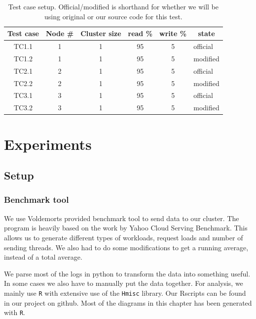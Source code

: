 \begin{center}
\begin{table}[h]
	\begin{tabular}{|c|c|c|c|c|l|}
		\multicolumn{1}{c}{Test case} & 
		\multicolumn{1}{c}{Node \#} &
		\multicolumn{1}{c}{Cluster size} &  
		\multicolumn{1}{c}{read \%} & 
		\multicolumn{1}{c}{write \%} & 
		\multicolumn{1}{c}{state} \\
		\hline

		TC1.1 & 1 & 1 & 95 & 5 & official \\
		TC1.2 & 1 & 1 & 95 & 5 & modified \\
		\hline
		TC2.1 & 2 & 1 & 95 & 5 & official \\
		TC2.2 & 2 & 1 & 95 & 5 & modified \\
		\hline
		TC3.1 & 3 & 1 & 95 & 5 & official \\
		TC3.2 & 3 & 1 & 95 & 5 & modified \\

		\hline
	\end{tabular}
	\caption{Test case setup. Official/modified is shorthand for whether we will be using original or our source code for this test.}
	\label{tbl:testcases}
\end{table}
\end{center}




\section{Experiments}
\subsection{Setup}
\subsubsection{Benchmark tool}
We use Voldemorts provided benchmark tool to send data to our cluster. The program is heavily based on the work by Yahoo Cloud Serving Benchmark. This allows us to generate different types of workloads, request loads and number of sending threads. We also had to do some modifications to get a running average, instead of a total average.

We parse most of the logs in python to transform the data into something useful. In some cases we also have to manually put the data together.
For analysis, we mainly use \texttt{R}\cite{Rproject} with extensive use of the \texttt{Hmisc}\cite{Hmisc} library. Our Rscripts can be found in our project on github\cite{githubproject}. Most of the diagrams in this chapter has been generated with \texttt{R}.

